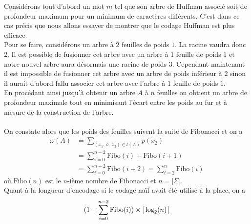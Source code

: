 \documentclass[a4paper, 12pt]{article}
\DeclarePairedDelimiter{\ceil}{\lceil}{\rceil}
\begin{document}
Considérons tout d'abord un mot $m$ tel que son arbre de Huffman associé soit de profondeur maximum pour un minimum de caractères différents. C'est dans ce cas précis que nous allons essayer de montrer que le codage Huffman est plus efficace. \\
Pour se faire, considérons un arbre à $2$ feuilles de poids $1$. La racine vaudra donc $2$. Il est possible de fusionner cet arbre avec un arbre à $1$ feuille de poids $1$ et notre nouvel arbre aura désormais une racine de poids $3$. Cependant maintenant il est impossible de fusionner cet arbre avec un arbre de poids inférieur à $2$ sinon il aurait d'abord fallu associer cet arbre avec l'arbre à $1$ feuille de poids $1$. \\
En procédant ainsi jusqu'à obtenir un arbre $A$ à $n$ feuilles on obtient un arbre de profondeur maximale tout en minimisant l'écart entre les poids au fur et à mesure de la construction de l'arbre. \\ \\
On constate alors que les poids des feuilles suivent la suite de Fibonacci et on a
\begin{align*}
\omega(A) &= \sum_{(x_1,\ b,\ x_2)\in t(A)} p(x_2)‎‎ \\
&= \sum_{i = 0}^{n-2} \text{Fibo}(i)+\text{Fibo}(i+1) \\
&= \sum_{i = 0}^{n-2} \text{Fibo}(i+2) = \sum_{i = 2}^n \text{Fibo}(i)
\end{align*}
où $\text{Fibo}(n)$ est le $n$-ième nombre de Fibonacci et $n = |\Sigma|$. \\
Quant à la longueur d'encodage si le codage naïf avait été utilisé à la place, on a
$$
(1+\sum_{i = 0}^{n-2}\text{Fibo}(i))\times \ceil[\big]{\text{log}_2(n)}
$$
\end{document}

